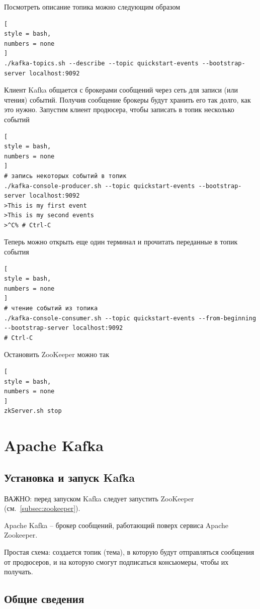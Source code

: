 \documentclass[%
	11pt,
	a4paper,
	utf8,
		]{article}
\begin{document}
Посмотреть описание топика можно следующим образом
\begin{lstlisting}[
style = bash,
numbers = none	
]
./kafka-topics.sh --describe --topic quickstart-events --bootstrap-server localhost:9092
\end{lstlisting}

Клиент Kafka общается с брокерами сообщений через сеть для записи (или чтения) событий. Получив сообщение брокеры будут хранить его так долго, как это нужно. Запустим клиент продюсера, чтобы записать в топик несколько событий
\begin{lstlisting}[
style = bash,
numbers = none	
]
# запись некоторых событий в топик
./kafka-console-producer.sh --topic quickstart-events --bootstrap-server localhost:9092
>This is my first event
>This is my second events
>^C% # Ctrl-C
\end{lstlisting}

Теперь можно открыть еще один терминал и прочитать переданные в топик события
\begin{lstlisting}[
style = bash,
numbers = none
]
# чтение событий из топика
./kafka-console-consumer.sh --topic quickstart-events --from-beginning --bootstrap-server localhost:9092
# Ctrl-C
\end{lstlisting}

Остановить ZooKeeper можно так
\begin{lstlisting}[
style = bash,
numbers = none	
]
zkServer.sh stop
\end{lstlisting}




\section{Apache Kafka}\label{sec:kafka}

\subsection{Установка и запуск Kafka}

ВАЖНО: перед запуском Kafka следует запустить ZooKeeper (см.~\ref{subsec:zookeeper}).

Apache Kafka -- брокер сообщений, работающий поверх сервиса Apache Zookeeper.

Простая схема: создается топик (тема), в которую будут отправляться сообщения от продюсеров, и на которую смогут подписаться консьюмеры, чтобы их получать.

\subsection{Общие сведения}
\end{document}
